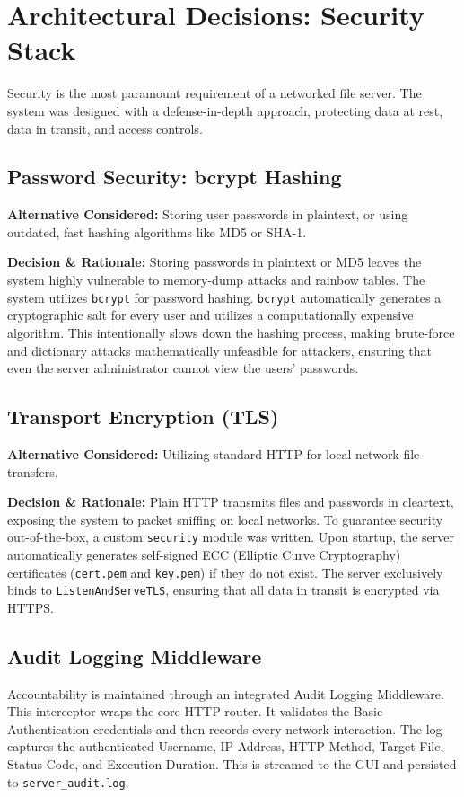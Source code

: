 \documentclass[12pt, a4paper]{article}
\begin{document}
\newpage
\section{Architectural Decisions: Security Stack}
Security is the most paramount requirement of a networked file server. The system was designed with a defense-in-depth approach, protecting data at rest, data in transit, and access controls.

\subsection{Password Security: bcrypt Hashing}
\textbf{Alternative Considered:} Storing user passwords in plaintext, or using outdated, fast hashing algorithms like MD5 or SHA-1.

\textbf{Decision \& Rationale:} Storing passwords in plaintext or MD5 leaves the system highly vulnerable to memory-dump attacks and rainbow tables. The system utilizes \texttt{bcrypt} for password hashing. \texttt{bcrypt} automatically generates a cryptographic salt for every user and utilizes a computationally expensive algorithm. This intentionally slows down the hashing process, making brute-force and dictionary attacks mathematically unfeasible for attackers, ensuring that even the server administrator cannot view the users' passwords.

\subsection{Transport Encryption (TLS)}
\textbf{Alternative Considered:} Utilizing standard HTTP for local network file transfers.

\textbf{Decision \& Rationale:} Plain HTTP transmits files and passwords in cleartext, exposing the system to packet sniffing on local networks. To guarantee security out-of-the-box, a custom \texttt{security} module was written. Upon startup, the server automatically generates self-signed ECC (Elliptic Curve Cryptography) certificates (\texttt{cert.pem} and \texttt{key.pem}) if they do not exist. The server exclusively binds to \texttt{ListenAndServeTLS}, ensuring that all data in transit is encrypted via HTTPS.

\subsection{Audit Logging Middleware}
Accountability is maintained through an integrated Audit Logging Middleware. This interceptor wraps the core HTTP router. It validates the Basic Authentication credentials and then records every network interaction. The log captures the authenticated Username, IP Address, HTTP Method, Target File, Status Code, and Execution Duration. This is streamed to the GUI and persisted to \texttt{server\_audit.log}.
\end{document}
